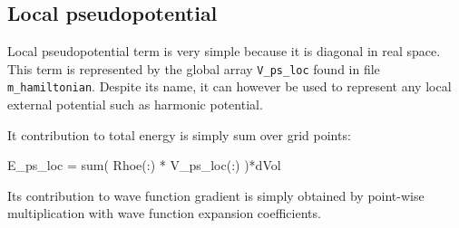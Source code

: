\subsection{Local pseudopotential}

Local pseudopotential term is very simple because it is diagonal
in real space.
This term is represented by the global array {\tt V\_ps\_loc}
found in file {\tt m_hamiltonian}. Despite its name, it can
however be used to represent any local external potential
such as harmonic potential.

It contribution to total energy is simply sum over grid
points:
\begin{fortrancode}
E_ps_loc = sum( Rhoe(:) * V_ps_loc(:) )*dVol
\end{fortrancode}

Its contribution to wave function gradient is simply obtained by
point-wise multiplication with wave function expansion
coefficients.


